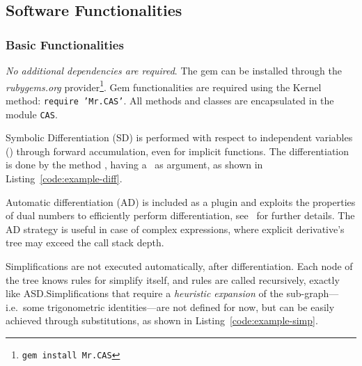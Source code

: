 \subsection{Software Functionalities}
\label{sec:functionalities}

\subsubsection{Basic Functionalities}

\emph{No additional dependencies are required}. The gem can be installed through the \emph{rubygems.org} provider\footnote{\texttt{gem install Mr.CAS}}. Gem functionalities are required using the Kernel method: \texttt{require 'Mr.CAS'}. All methods and classes are encapsulated in the module \texttt{CAS}.


Symbolic Differentiation (SD) is performed with respect to independent variables (\CASVariable) through forward accumulation, even for implicit functions. The differentiation is done by the method \CASOpdiff, having a \CASVariable~as argument, as shown in Listing~\ref{code:example-diff}.

\noindent%


Automatic differentiation (AD) is included as a plugin and exploits the properties of dual numbers to efficiently perform differentiation, see~\cite{bartholomew2000automatic} for further details. The AD strategy is useful in case of complex expressions, where explicit derivative's tree may exceed the call stack depth.

Simplifications are not executed automatically, after differentiation. Each node of the tree knows rules for simplify itself, and rules are called recursively, exactly like ASD.\@ Simplifications that require a \emph{heuristic expansion} of the sub-graph---i.e.\ some trigonometric identities---are not defined for now, but can be easily achieved through substitutions, as shown in Listing~\ref{code:example-simp}.

